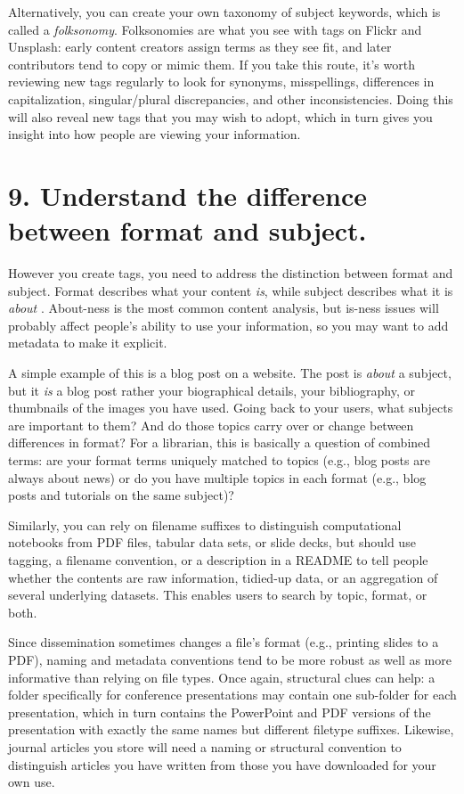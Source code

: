 \documentclass[10pt,letterpaper]{article}
\newcommand{\rulemajor}[1]{\section*{#1}}
\begin{document}
Alternatively, you can create your own taxonomy of subject keywords, which is
called a \emph{folksonomy}. Folksonomies are what you see with tags on Flickr
and Unsplash: early content creators assign terms as they see fit, and later
contributors tend to copy or mimic them. If you take this route, it's worth
reviewing new tags regularly to look for synonyms, misspellings, differences in
capitalization, singular/plural discrepancies, and other inconsistencies.  Doing
this will also reveal new tags that you may wish to adopt, which in turn gives
you insight into how people are viewing your information.

\rulemajor{9. Understand the difference between format and subject.}

However you create tags, you need to address the distinction between format and
subject. Format describes what your content \emph{is}, while subject describes
what it is \emph{about} \cite{Joudrey2015}. About-ness is the most common
content analysis, but is-ness issues will probably affect people's ability to
use your information, so you may want to add metadata to make it explicit.

A simple example of this is a blog post on a website. The post is \emph{about} a
subject, but it \emph{is} a blog post rather your biographical details, your
bibliography, or thumbnails of the images you have used.  Going back to your
users, what subjects are important to them? And do those topics carry over or
change between differences in format? For a librarian, this is basically a
question of combined terms: are your format terms uniquely matched to topics
(e.g., blog posts are always about news) or do you have multiple topics in each
format (e.g., blog posts and tutorials on the same subject)?

Similarly, you can rely on filename suffixes to distinguish computational
notebooks from PDF files, tabular data sets, or slide decks, but should use
tagging, a filename convention, or a description in a README to tell people
whether the contents are raw information, tidied-up data, or an aggregation of
several underlying datasets. This enables users to search by topic, format, or
both.

Since dissemination sometimes changes a file's format (e.g., printing slides to
a PDF), naming and metadata conventions tend to be more robust as well as more
informative than relying on file types. Once again, structural clues can help: a
folder specifically for conference presentations may contain one sub-folder for
each presentation, which in turn contains the PowerPoint and PDF versions of the
presentation with exactly the same names but different filetype suffixes.
Likewise, journal articles you store will need a naming or structural convention
to distinguish articles you have written from those you have downloaded for your
own use.
\end{document}
